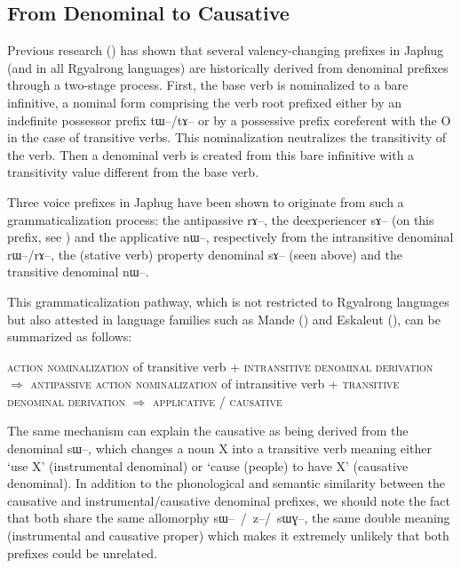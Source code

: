\documentclass[oldfontcommands,oneside,a4paper,11pt]{article}
\newcommand{\ipa}[1]{{\phon \mbox{#1}}} %
\begin{document}
\subsection{From Denominal to Causative}
Previous research (\citealt{jacques14antipassive}) has shown that several valency-changing prefixes in Japhug (and in all Rgyalrong languages) are historically derived from denominal prefixes through a two-stage process. First, the base verb is nominalized to a bare infinitive, a nominal form comprising the verb root prefixed  either by an indefinite possessor prefix \ipa{tɯ--/tɤ--} or by a possessive prefix coreferent with the O in the case of transitive verbs. This nominalization neutralizes the transitivity of the verb. Then a denominal verb is created from this bare infinitive with a transitivity value different from the base verb. 

Three voice prefixes in Japhug have been shown to originate from such a grammaticalization process: the antipassive \ipa{rɤ--}, the deexperiencer \ipa{sɤ--} (on this prefix, see \citealt{jacques12demotion}) and the applicative \ipa{nɯ--}, respectively from the intransitive denominal \ipa{rɯ--/rɤ--}, the (stative verb) property denominal \ipa{sɤ--} (seen above) and the transitive denominal \ipa{nɯ--}.

This grammaticalization pathway, which is not restricted to Rgyalrong languages but also attested in language families such as Mande (\citealt{creissels12antip}) and Eskaleut (\citet{fortescue96halftrans}),  can be summarized as follows:


\begin{exe}
\ex \label{ex:pathway}
\glt \textsc{action nominalization} of transitive verb + \textsc{intransitive denominal derivation} $\Rightarrow$ \textsc{antipassive}
\ex
\glt \textsc{action nominalization} of intransitive verb + \textsc{transitive denominal derivation} $\Rightarrow$ \textsc{applicative} / \textsc{causative}
\end{exe}


The same mechanism can explain the causative as being derived from the denominal \ipa{sɯ--}, which changes a noun X into a transitive verb meaning either `use X' (instrumental denominal) or `cause (people) to have X' (causative denominal). In addition to the phonological and semantic similarity between the causative and instrumental/causative denominal prefixes, we should note the fact that both share the same allomorphy \ipa{sɯ-- / z--/ sɯɣ--}, the  same double meaning (instrumental and causative proper) which makes it extremely unlikely that both prefixes could be unrelated.
\end{document}
